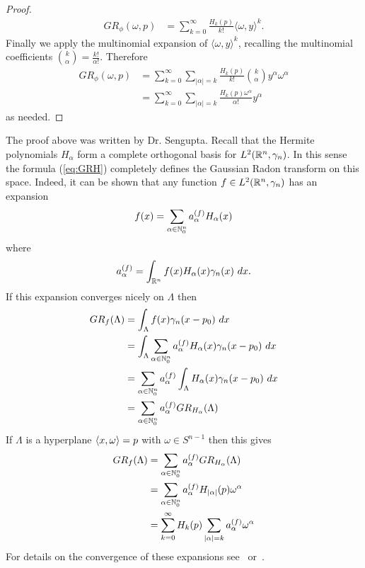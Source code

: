 \begin{proof}
  \begin{align*}
    GR_{\phi}(\omega, p) 
      &= \sum_{k = 0}^\infty \frac{H_k(p)}{k!} \langle \omega, y\rangle^k.
  \end{align*}
  Finally we apply the multinomial expansion of $\langle \omega, y\rangle^k$, recalling the multinomial coefficients $\binom{k}{\alpha} = \frac{k!}{\alpha!}$. Therefore
  \begin{align*}
    GR_{\phi}(\omega, p)
      &= \sum_{k = 0}^\infty \sum_{|\alpha| = k} \frac{H_k(p)}{k!} \binom{k}\alpha y^\alpha\omega^\alpha
    \\
      &= \sum_{k = 0}^\infty \sum_{|\alpha| = k} \frac{H_k(p)\omega^\alpha}{\alpha!} y^\alpha
  \end{align*}
  as needed.
\end{proof}

\begin{remark}
  The proof above was written by Dr. Sengupta. Recall that the Hermite polynomials $H_\alpha$ form a complete orthogonal basis for $L^2(\mathbb{R}^n, \gamma_n)$. In this sense the formula (\ref{eq:GRH}) completely defines the Gaussian Radon transform on this space. Indeed, it can be shown that any function $f \in L^2(\mathbb{R}^n, \gamma_n)$ has an expansion
  \[
    f(x) = \sum_{\alpha \in \mathbb{N}_0^n} a^{(f)}_\alpha H_\alpha(x)
  \]
  where
  \[
    a_\alpha^{(f)} = \int_{\mathbb{R}^n} f(x)H_\alpha(x) \gamma_n(x) ~dx.
  \]
  If this expansion converges nicely on $\Lambda$ then
  \begin{align*}
    GR_f(\Lambda) 
    &= \int_\Lambda f(x) \gamma_n(x-p_0)~dx 
    \\ 
    &= \int_\Lambda \sum_{\alpha \in \mathbb{N}_0^n} a_\alpha^{(f)} H_\alpha(x) \gamma_n(x-p_0) ~dx
    \\
    &= \sum_{\alpha \in \mathbb{N}_0^n} a_\alpha^{(f)} \int_\Lambda H_\alpha(x) \gamma_n(x-p_0) ~dx
    \\
    &= \sum_{\alpha \in \mathbb{N}_0^n} a_\alpha^{(f)} GR_{H_\alpha}(\Lambda)
  \end{align*}
  If $\Lambda$ is a hyperplane $\left\langle x, \omega \right\rangle = p$ with $\omega \in S^{n-1}$ then this gives
  \begin{align*}
    GR_f(\Lambda) 
    &= \sum_{\alpha \in \mathbb{N}_0^n} a_\alpha^{(f)} GR_{H_\alpha}(\Lambda)
    \\
    &= \sum_{\alpha \in \mathbb{N}_0^n} a_\alpha^{(f)} H_{|\alpha|}(p) \omega^\alpha
    \\
    &= \sum_{k=0}^\infty H_k(p) \sum_{|\alpha| = k} a_\alpha^{(f)} \omega^\alpha
  \end{align*}
  For details on the convergence of these expansions see~\cite{DuXu01} or~\cite{Than93}. 
\end{remark}

